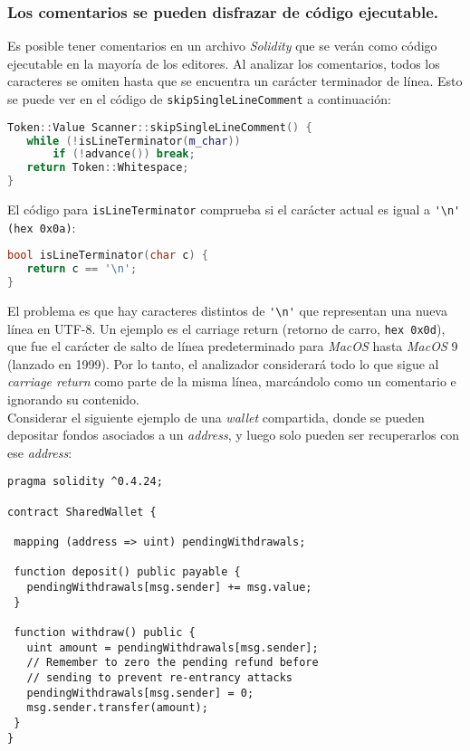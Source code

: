 \subsubsection{Los comentarios se pueden disfrazar de código ejecutable.}

Es posible tener comentarios en un archivo \textit{Solidity} que se verán como código ejecutable en la mayoría de los editores. Al analizar los comentarios, todos los caracteres se omiten hasta que se encuentra un carácter terminador de línea. Esto se puede ver en el código de \verb|skipSingleLineComment| a continuación:\\

\begin{lstlisting}[language=c++, caption={Parte del código de \texttt{skipSingleLineComment}}]
Token::Value Scanner::skipSingleLineComment() {
   while (!isLineTerminator(m_char))
       if (!advance()) break;
   return Token::Whitespace;
}
\end{lstlisting}

El código para \verb|isLineTerminator| comprueba si el carácter actual es igual a \verb|'\n' (hex 0x0a)|:
\begin{lstlisting}[language=c++, caption={Código de \texttt{isLineTerminator}}]
bool isLineTerminator(char c) {
   return c == '\n';
}
\end{lstlisting}

El problema es que hay caracteres distintos de \verb|'\n'| que representan una nueva línea en UTF-8. Un ejemplo es el carriage return (retorno de carro, \verb|hex 0x0d|), que fue el carácter de salto de línea predeterminado para \textit{MacOS} hasta \textit{MacOS} 9 (lanzado en 1999). Por lo tanto, el analizador considerará todo lo que sigue al \textit{carriage return} como parte de la misma línea, marcándolo como un comentario e ignorando su contenido.\\

Considerar el siguiente ejemplo de una \textit{wallet} compartida, donde se pueden depositar fondos asociados a un \textit{address}, y luego solo pueden ser recuperarlos con ese \textit{address}:\\

\begin{lstlisting}[language=Solidity, caption={Código ejemplar de una \textit{shared wallet}}]
pragma solidity ^0.4.24;

contract SharedWallet {

 mapping (address => uint) pendingWithdrawals;

 function deposit() public payable {
   pendingWithdrawals[msg.sender] += msg.value;
 }

 function withdraw() public {
   uint amount = pendingWithdrawals[msg.sender];
   // Remember to zero the pending refund before
   // sending to prevent re-entrancy attacks
   pendingWithdrawals[msg.sender] = 0;  
   msg.sender.transfer(amount);
 }
}
\end{lstlisting}


